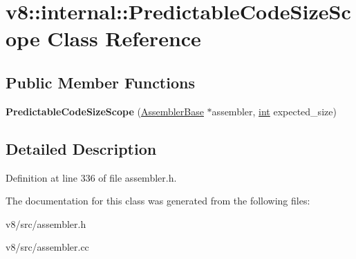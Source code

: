 \hypertarget{classv8_1_1internal_1_1PredictableCodeSizeScope}{}\section{v8\+:\+:internal\+:\+:Predictable\+Code\+Size\+Scope Class Reference}
\label{classv8_1_1internal_1_1PredictableCodeSizeScope}
\subsection*{Public Member Functions}
\begin{DoxyCompactItemize}
\item 
\mbox{\label{classv8_1_1internal_1_1PredictableCodeSizeScope_ae85d285b218bedb8bd2ab9d3c37a930d}} 
{\bfseries Predictable\+Code\+Size\+Scope} (\mbox{\hyperlink{classv8_1_1internal_1_1AssemblerBase}{Assembler\+Base}} $\ast$assembler, \mbox{\hyperlink{classint}{int}} expected\+\_\+size)
\end{DoxyCompactItemize}


\subsection{Detailed Description}


Definition at line 336 of file assembler.\+h.



The documentation for this class was generated from the following files\+:\begin{DoxyCompactItemize}
\item 
v8/src/assembler.\+h\item 
v8/src/assembler.\+cc\end{DoxyCompactItemize}
